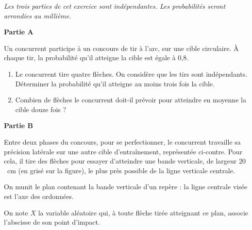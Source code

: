 \documentclass[12pt,french]{article}
\begin{document}
\begin{question}[subtitle={Asie 2015}]
\emph{Les trois parties de cet exercice sont indépendantes. Les probabilités seront arrondies au millième.}

\bigskip

\textbf{Partie A}

\medskip

Un concurrent participe à un concours de tir à l'arc, sur une cible circulaire.
À chaque tir, la probabilité qu'il atteigne la cible est égale à $0$,8.

\medskip

\begin{enumerate}
\item Le concurrent tire quatre flèches. On considère que les tirs sont indépendants.
Déterminer la probabilité qu'il atteigne au moins trois fois la cible.
\item Combien de flèches le concurrent doit-il prévoir pour atteindre en moyenne la cible douze fois ?
\end{enumerate}

\bigskip

\textbf{Partie B}

\medskip

\parbox{0.65\linewidth}{Entre deux phases du concours, pour se perfectionner, le concurrent travaille sa précision latérale sur une autre cible d'entraînement,
représentée ci-contre. Pour cela, il tire des flèches pour essayer d'atteindre une bande verticale, de largeur $20$~cm (en grisé sur la figure), le plus près possible de la ligne verticale centrale.

On munit le plan contenant la bande verticale d'un repère : la ligne centrale visée est l'axe des
ordonnées.

On note $X$ la variable aléatoire qui, à toute flèche tirée atteignant ce plan, associe l'abscisse de son point d'impact.}\hfill
%


\end{question}
\end{document}
